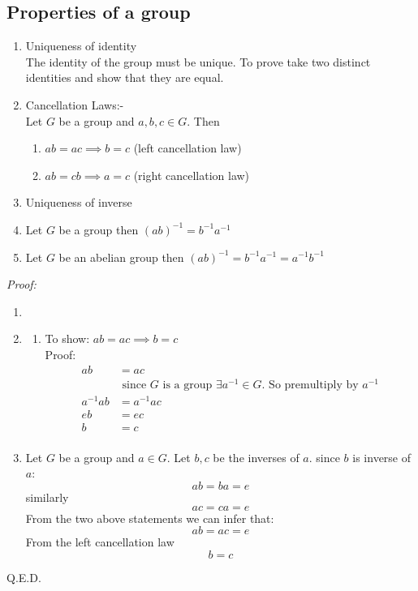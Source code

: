 \documentclass[11pt,letterpaper]{article}
\newenvironment{myproof} 
        {\textit{Proof:}}                                   
        {\begin{flushright} Q.E.D. \end{flushright}}
\begin{document}
\subsection{Properties of a group}
\begin{enumerate}
  \item Uniqueness of identity\\ 
    The identity of the group must be unique. To prove take two distinct identities and show that they are equal.
  \item Cancellation Laws:- \\
    Let $G$ be a group and $a,b,c \in G$. Then 
    \begin{enumerate}
      \item $ab = ac \implies b = c$ (left cancellation law) 
      \item $ab = cb \implies a = c$ (right cancellation law)
    \end{enumerate}
  \item Uniqueness of inverse
  \item Let $G$ be a group then $(ab)^{-1} = b^{-1}a^{-1}$
  \item Let $G$ be an abelian group then $(ab)^{-1} = b^{-1}a^{-1} = a^{-1}b^{-1}$
\end{enumerate}

\begin{myproof}
  \begin{enumerate}
    \item 
    \item 
      \begin{enumerate}
        \item To show: $ab = ac \implies b = c$ \\
          Proof: 
          \begin{align*}
            ab &= ac \\ 
               &\text{ since $G$ is a group $\exists a^{-1} \in G$. So premultiply by $a^{-1}$}\\
            a^{-1}ab &= a^{-1}ac \\ 
            eb &= ec \\ 
            b &= c \\ 
          \end{align*}
      \end{enumerate}
    \item Let $G$ be a group and $a \in G$. 
      Let $b, c$ be the inverses of $a$. 
      since $b$ is inverse of $a$:
      \[
        ab = ba = e 
      \]
      similarly
      \[
        ac = ca = e 
      \]
      From the two above statements we can infer that: 
      \[
        ab = ac = e
      \]
      From the left cancellation law
      \[
        b = c
      \]
  \end{enumerate}
\end{myproof}
\end{document}

